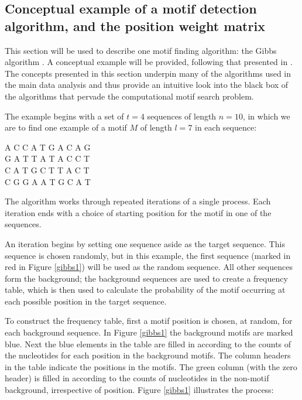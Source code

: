 \documentclass[12pt]{article}
\begin{document}
\subsection{Conceptual example of a motif detection algorithm, and the position weight matrix}
This section will be used to describe one motif finding algorithm: the Gibbs algorithm \citep{Lawrence1993Gibbs}. A conceptual example will be provided, following that presented in \citet{jones2004introduction}. The concepts presented in this section underpin many of the algorithms
used in the main data analysis and thus provide an intuitive look into the black box of the algorithms that pervade the computational motif search problem. 

The example begins with a set of  $t=4$ sequences of length $n=10$, in which we are to find one example of a motif $M$ of length $l=7$ in each sequence:
\begin{center}
A  C  C  A  T  G  A  C  A  G\\
G  A  T  T  A  T  A  C  C  T\\
C  A  T  G  C  T  T  A  C  T\\
C  G  G  A  A  T  G  C  A  T\\
\end{center}
The algorithm works through repeated iterations of a single process. Each iteration ends with a choice of starting position for the motif in one of the sequences.

An iteration begins by setting one sequence aside as the target sequence. This sequence is chosen randomly, but in this example, the first sequence (marked in red in Figure \ref{gibbs1}) will be used as the random sequence. All other sequences form the background; the background sequences are used to create a frequency table, which is then used to calculate the probability of the motif occurring at each possible position in the target sequence.

To construct the frequency table, first a motif position is chosen, at random, for each background sequence. In Figure \ref{gibbs1} the background motifs are marked blue. Next the blue elements in the table are filled in according to the counts of the nucleotides for each position in the background motifs. The column headers in the table indicate the positions in the motifs. The green column (with the zero header) is filled in according to the counts of nucleotides in the non-motif background, irrespective of position. Figure \ref{gibbs1} illustrates the process:
\end{document}
